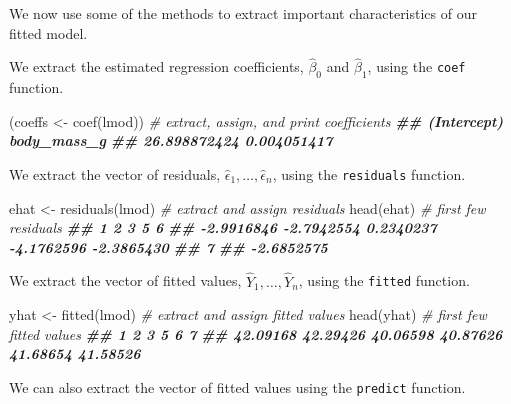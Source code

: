 \documentclass[
]{book}
\newenvironment{Shaded}{\begin{snugshade}}{\end{snugshade}}
\newcommand{\CommentTok}[1]{\textcolor[rgb]{0.56,0.35,0.01}{\textit{#1}}}
\newcommand{\DocumentationTok}[1]{\textcolor[rgb]{0.56,0.35,0.01}{\textbf{\textit{#1}}}}
\newcommand{\FunctionTok}[1]{\textcolor[rgb]{0.00,0.00,0.00}{#1}}
\newcommand{\NormalTok}[1]{#1}
\newcommand{\OtherTok}[1]{\textcolor[rgb]{0.56,0.35,0.01}{#1}}
\theoremstyle{definition}
\theoremstyle{definition}
\theoremstyle{definition}
\theoremstyle{definition}
\theoremstyle{remark}
\begin{document}
We now use some of the methods to extract important characteristics of our fitted model.

We extract the estimated regression coefficients, \(\hat{\beta}_0\) and \(\hat{\beta}_1\), using the \texttt{coef} function.

\begin{Shaded}
\begin{Highlighting}[]
\NormalTok{(coeffs }\OtherTok{\textless{}{-}} \FunctionTok{coef}\NormalTok{(lmod)) }\CommentTok{\# extract, assign, and print coefficients}
\DocumentationTok{\#\#  (Intercept)  body\_mass\_g }
\DocumentationTok{\#\# 26.898872424  0.004051417}
\end{Highlighting}
\end{Shaded}

We extract the vector of residuals, \(\hat{\epsilon}_1,\ldots, \hat{\epsilon}_n\), using the \texttt{residuals} function.

\begin{Shaded}
\begin{Highlighting}[]
\NormalTok{ehat }\OtherTok{\textless{}{-}} \FunctionTok{residuals}\NormalTok{(lmod) }\CommentTok{\# extract and assign residuals}
\FunctionTok{head}\NormalTok{(ehat) }\CommentTok{\# first few residuals}
\DocumentationTok{\#\#          1          2          3          5          6 }
\DocumentationTok{\#\# {-}2.9916846 {-}2.7942554  0.2340237 {-}4.1762596 {-}2.3865430 }
\DocumentationTok{\#\#          7 }
\DocumentationTok{\#\# {-}2.6852575}
\end{Highlighting}
\end{Shaded}

We extract the vector of fitted values, \(\hat{Y}_1,\ldots, \hat{Y}_n\), using the \texttt{fitted} function.

\begin{Shaded}
\begin{Highlighting}[]
\NormalTok{yhat }\OtherTok{\textless{}{-}} \FunctionTok{fitted}\NormalTok{(lmod) }\CommentTok{\# extract and assign fitted values}
\FunctionTok{head}\NormalTok{(yhat) }\CommentTok{\# first few fitted values}
\DocumentationTok{\#\#        1        2        3        5        6        7 }
\DocumentationTok{\#\# 42.09168 42.29426 40.06598 40.87626 41.68654 41.58526}
\end{Highlighting}
\end{Shaded}

We can also extract the vector of fitted values using the \texttt{predict} function.
\end{document}
